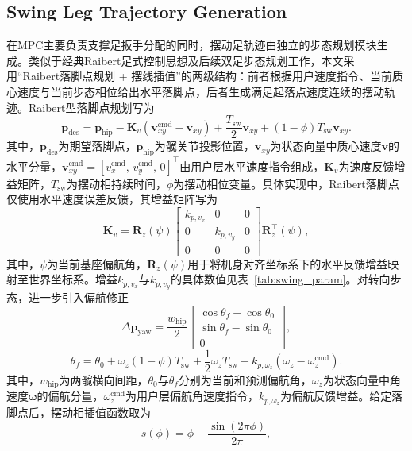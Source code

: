 ﻿\documentclass[preprint,12pt]{elsarticle}
\begin{document}
\subsection{Swing Leg Trajectory Generation}
在MPC主要负责支撑足扳手分配的同时，摆动足轨迹由独立的步态规划模块生成。类似于经典Raibert足式控制思想及后续双足步态规划工作\cite{ref63,ref79}，本文采用“Raibert落脚点规划 + 摆线插值”的两级结构：前者根据用户速度指令、当前质心速度与当前步态相位给出水平落脚点，后者生成满足起落点速度连续的摆动轨迹。Raibert型落脚点规划写为\begin{equation}
\bm p_{\text{des}}
=\bm p_{\text{hip}}
-\bm K_v(\bm v_{xy}^{\mathrm{cmd}}-\bm v_{xy})
+\frac{T_{\text{sw}}}{2}\bm v_{xy}
+(1-\phi)T_{\text{sw}}\bm v_{xy}.
\label{eq:raibert}
\end{equation}
其中，$\bm p_{\text{des}}$为期望落脚点，$\bm p_{\text{hip}}$为髋关节投影位置，$\bm v_{xy}$为状态向量中质心速度$\bm v$的水平分量，$\bm v_{xy}^{\mathrm{cmd}}=[v_x^{\mathrm{cmd}},\,v_y^{\mathrm{cmd}},\,0]^\top$由用户层水平速度指令组成，$\bm K_v$为速度反馈增益矩阵，$T_{\text{sw}}$为摆动相持续时间，$\phi$为摆动相位变量。具体实现中，Raibert落脚点仅使用水平速度误差反馈，其增益矩阵写为
\begin{equation}
\bm K_v
=\bm R_z(\psi)
\begin{bmatrix}
k_{p,v_x} & 0 & 0\\
0 & k_{p,v_y} & 0\\
0 & 0 & 0
\end{bmatrix}
\bm R_z^\top(\psi),
\label{eq:swing_kv}
\end{equation}
其中，$\psi$为当前基座偏航角，$\bm R_z(\psi)$用于将机身对齐坐标系下的水平反馈增益映射至世界坐标系。增益$k_{p,v_x}$与$k_{p,v_y}$的具体数值见表~\ref{tab:swing_param}。对转向步态，进一步引入偏航修正\begin{equation}
\Delta \bm p_{\text{yaw}}
=\frac{w_{\text{hip}}}{2}
\begin{bmatrix}
\cos\theta_f-\cos\theta_0\\
\sin\theta_f-\sin\theta_0\\
0
\end{bmatrix},
\end{equation}
\begin{equation}
\theta_f=\theta_0+\omega_z(1-\phi)T_{\text{sw}}+\frac{1}{2}\omega_zT_{\text{sw}}+k_{p,\omega_z}(\omega_z-\omega_z^{\mathrm{cmd}}).
\label{eq:yaw}
\end{equation}
其中，$w_{\text{hip}}$为两髋横向间距，$\theta_0$与$\theta_f$分别为当前和预测偏航角，$\omega_z$为状态向量中角速度$\bm\omega$的偏航分量，$\omega_z^{\mathrm{cmd}}$为用户层偏航角速度指令，$k_{p,\omega_z}$为偏航反馈增益。给定落脚点后，摆动相插值函数取为\begin{equation}
s(\phi)=\phi-\frac{\sin(2\pi\phi)}{2\pi},
\label{eq:phase}
\end{equation}
\end{document}
